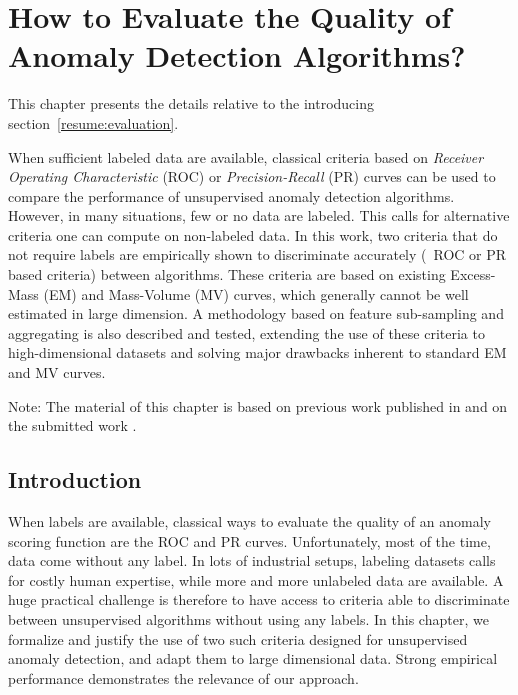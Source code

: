 \chapter{How to Evaluate the Quality of Anomaly Detection Algorithms?}
\label{chap:evaluation}

\begin{chapabstract}
This chapter presents the details relative to the introducing section~\ref{resume:evaluation}.

When sufficient labeled data are available, classical criteria based on \emph{Receiver Operating Characteristic} (ROC) or \emph{Precision-Recall} (PR) curves can be used to compare the performance of unsupervised anomaly detection algorithms. However, in many situations, few or no data are labeled. This calls for alternative criteria one can compute on non-labeled data. In this work, two criteria that do not require labels are empirically shown to discriminate accurately (\wrt~ROC or PR based criteria) between algorithms. 
These criteria are based on existing Excess-Mass (EM) and Mass-Volume (MV) curves, which generally cannot be well estimated in large dimension.
A methodology based on feature sub-sampling and aggregating is also described and tested, extending the use of these criteria to high-dimensional datasets and solving major drawbacks inherent to standard EM and MV curves.
\end{chapabstract}

Note: The material of this chapter is based on previous work published in \cite{ICMLworkshop16} and on the submitted work \cite{NIPS16evaluation}.


\section{Introduction}
\label{evaluation:sec:intro}
When labels are available, classical ways to evaluate the quality of an anomaly scoring function are the ROC and PR curves.
Unfortunately, most of the time, data come without any label. In lots of industrial setups, labeling datasets calls for costly human expertise, while more and more unlabeled data are available.
A huge practical challenge is therefore to have access to criteria able to discriminate between unsupervised algorithms without using any labels. 
In this chapter, we formalize and justify the use of two such criteria designed for unsupervised anomaly detection, and adapt them to large dimensional data. Strong empirical performance demonstrates the relevance of our approach. %


